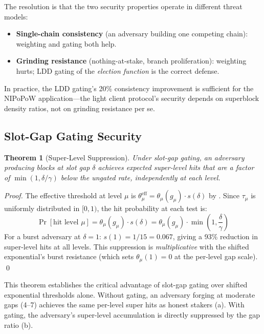 \documentclass[11pt]{article}
\newtheorem{theorem}{Theorem}
\begin{document}
The resolution is that the two security properties operate in different threat models:
\begin{itemize}
    \item \textbf{Single-chain consistency} (an adversary building one competing chain): weighting and gating both help.
    \item \textbf{Grinding resistance} (nothing-at-stake, branch proliferation): weighting hurts; LDD gating of the \emph{election function} is the correct defense.
\end{itemize}
In practice, the LDD gating's 20\% consistency improvement is sufficient for the NIPoPoW application---the light client protocol's security depends on superblock density ratios, not on grinding resistance per se.

\subsection{Slot-Gap Gating Security}

\begin{theorem}[Super-Level Suppression]
\label{thm:suppression}
Under slot-gap gating, an adversary producing blocks at slot gap $\delta$ achieves expected super-level hits that are a factor of $\min(1, \delta/\gamma)$ below the ungated rate, independently at each level.
\end{theorem}

\begin{proof}
The effective threshold at level $\mu$ is $\theta_\mu^{\text{eff}} = \theta_\mu(g_\mu) \cdot s(\delta)$ by . Since $\tau_\mu$ is uniformly distributed in $[0,1)$, the hit probability at each test is:
\[
\Pr[\text{hit level } \mu] = \theta_\mu(g_\mu) \cdot s(\delta) = \theta_\mu(g_\mu) \cdot \min\!\left(1, \frac{\delta}{\gamma}\right)
\]
For a burst adversary at $\delta = 1$: $s(1) = 1/15 = 0.067$, giving a 93\% reduction in super-level hits at all levels. This suppression is \emph{multiplicative} with the shifted exponential's burst resistance (which sets $\theta_\mu(1) = 0$ at the per-level gap scale). \qed
\end{proof}

This theorem establishes the critical advantage of slot-gap gating over shifted exponential thresholds alone. Without gating, an adversary forging at moderate gaps (4--7) achieves the same per-level super hits as honest stakers (a). With gating, the adversary's super-level accumulation is directly suppressed by the gap ratio (b).
\end{document}
